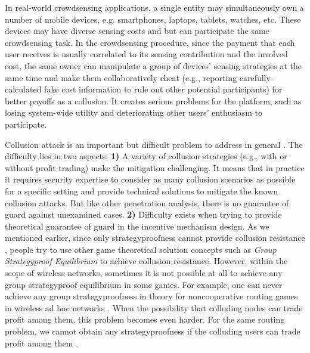 \documentclass[conference]{IEEEtran}
\theoremstyle{definition}
\begin{document}

In real-world crowdsensing applications, a single entity may simultaneously own a number of mobile devices, e.g. smartphones, laptops, tablets, watches, etc. These devices may have diverse sensing costs and but can participate the same crowdsensing task. In the crowdsensing procedure, since the payment that each user receives is usually correlated to its sensing contribution and the involved cost, the same owner can manipulate a group of devices' sensing strategies at the same time and make them collaboratively cheat (e.g., reporting carefully-calculated fake cost information to rule out other potential participants) for better payoffs as a collusion. It creates serious problems for the platform, such as losing system-wide utility and deteriorating other users' enthusiasm to participate.

Collusion attack is an important but difficult problem to address in general \cite{zhong2007designing, wang2006low, jurca2007collusion}. 
The difficulty lies in two aspects: \textbf{1)} A variety of collusion strategies (e.g., with or without profit trading) make the mitigation challenging. It means that in practice it requires security expertise to consider as many collusion scenarios as possible for a specific setting and provide technical solutions to mitigate the known collusion attacks. But like other penetration analysis, there is no guarantee of guard against unexamined cases. \textbf{2)} Difficulty exists when trying to provide theoretical guarantee of guard in the incentive mechanism design. 
As we mentioned earlier, since only strategyproofness cannot provide collusion resistance \cite{zhong2007designing}, people try to use other game theoretical solution concepts such as \emph{Group Strategyproof Equilibrium} \cite{jain1999group} to achieve collusion resistance. %
However, within the scope of wireless networks, sometimes it is not possible at all to achieve any group strategyproof equilibrium in some games. For example, one can never achieve any group strategyproofness in theory for noncooperative routing games in wireless ad hoc networks \cite{zhong2007designing}. When the possibility that colluding nodes can trade profit among them, this problem becomes even harder. For the same routing problem, we cannot obtain any strategyproofness if the colluding users can trade profit among them \cite{wang2006low}.
\end{document}
